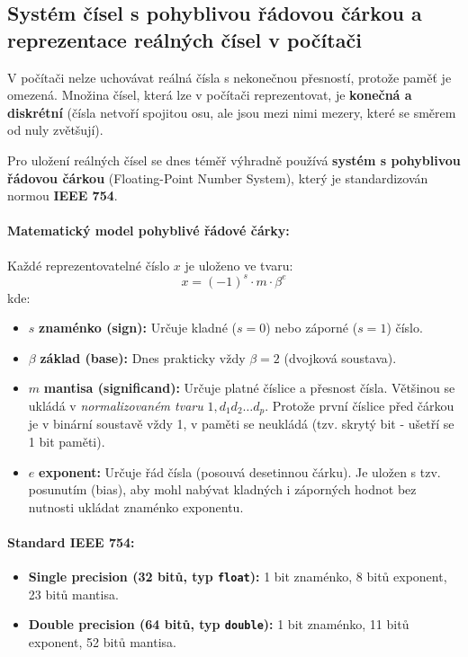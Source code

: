 \subsection{Systém čísel s pohyblivou řádovou čárkou a reprezentace reálných čísel v počítači}
V počítači nelze uchovávat reálná čísla s nekonečnou přesností, protože paměť je omezená. Množina čísel, která lze v počítači reprezentovat, je \textbf{konečná a diskrétní} (čísla netvoří spojitou osu, ale jsou mezi nimi mezery, které se směrem od nuly zvětšují). 

Pro uložení reálných čísel se dnes téměř výhradně používá \textbf{systém s pohyblivou řádovou čárkou} (Floating-Point Number System), který je standardizován normou \textbf{IEEE 754}.

\paragraph*{Matematický model pohyblivé řádové čárky:}
Každé reprezentovatelné číslo $x$ je uloženo ve tvaru:
\[ x = (-1)^s \cdot m \cdot \beta^e \]
kde:
\begin{itemize}
    \item $s$ \textbf{znaménko (sign):} Určuje kladné ($s=0$) nebo záporné ($s=1$) číslo.
    \item $\beta$ \textbf{základ (base):} Dnes prakticky vždy $\beta = 2$ (dvojková soustava).
    \item $m$ \textbf{mantisa (significand):} Určuje platné číslice a přesnost čísla. Většinou se ukládá v \textit{normalizovaném tvaru} $1,d_1 d_2 \dots d_p$. Protože první číslice před čárkou je v binární soustavě vždy 1, v paměti se neukládá (tzv. skrytý bit - ušetří se 1 bit paměti).
    \item $e$ \textbf{exponent:} Určuje řád čísla (posouvá desetinnou čárku). Je uložen s tzv. posunutím (bias), aby mohl nabývat kladných i záporných hodnot bez nutnosti ukládat znaménko exponentu.
\end{itemize}

\paragraph*{Standard IEEE 754:}
\begin{itemize}
    \item \textbf{Single precision (32 bitů, typ \texttt{float}):} 
    1 bit znaménko, 8 bitů exponent, 23 bitů mantisa. 
    \item \textbf{Double precision (64 bitů, typ \texttt{double}):} 
    1 bit znaménko, 11 bitů exponent, 52 bitů mantisa. 
\end{itemize}

